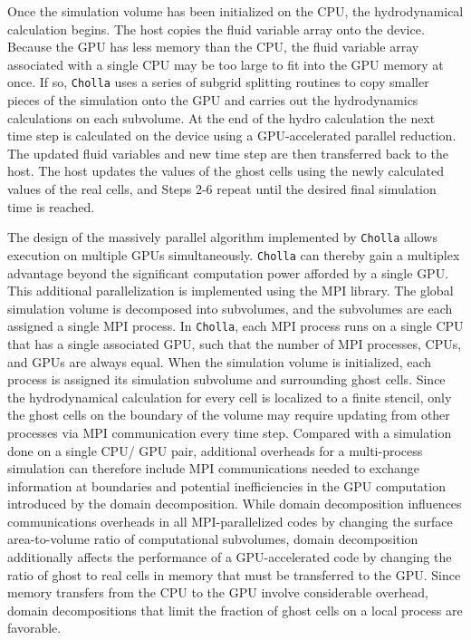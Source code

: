 \documentclass[11pt,letterpaper,english]{article}
\begin{document}
Once the simulation volume has been initialized on the CPU, the hydrodynamical calculation begins. The host copies the fluid variable array onto the device. Because the GPU has less memory than the CPU, the fluid variable array associated with a single CPU may be too large to fit into the GPU memory at once. If so, {\tt Cholla} uses a series of 
subgrid splitting routines to copy smaller pieces of the simulation onto the GPU and carries out the hydrodynamics calculations on each subvolume. At the end of the hydro calculation the next time step is calculated on the device using a GPU-accelerated parallel reduction. The updated fluid variables and new time step are then transferred back to the host. The host updates the values of the ghost cells using the newly calculated values of the real cells, and Steps 2-6 repeat until the desired final simulation time is reached.

The design of the massively parallel algorithm implemented by {\tt Cholla} allows execution on multiple GPUs simultaneously. {\tt Cholla} can thereby gain a multiplex advantage beyond the significant computation power afforded by a single GPU. This additional parallelization is implemented using the MPI library. The global simulation volume is decomposed into subvolumes, and the subvolumes are each assigned a single MPI process. In {\tt Cholla}, each MPI process runs on a single CPU that has a single associated GPU, such that the number of MPI processes, CPUs, and GPUs are always equal. When the simulation volume is initialized, each process is assigned its simulation subvolume and surrounding ghost cells. Since the hydrodynamical calculation for every cell is localized to a finite stencil, only the ghost cells on the boundary of the volume may require updating from other processes via MPI communication every time step. Compared with a simulation done on a single CPU/ GPU pair, additional overheads for a multi-process simulation can therefore include MPI communications needed to exchange information at boundaries and potential inefficiencies in the GPU computation introduced by the domain decomposition. While domain decomposition influences communications overheads in all MPI-parallelized codes by changing the surface area-to-volume ratio of computational subvolumes, domain decomposition additionally affects the performance of a GPU-accelerated code by changing the ratio of ghost to real cells in memory that must be transferred to the GPU. Since memory transfers from the CPU to the GPU involve considerable overhead, domain decompositions that limit the fraction of ghost cells on a local process are favorable.
\end{document}
